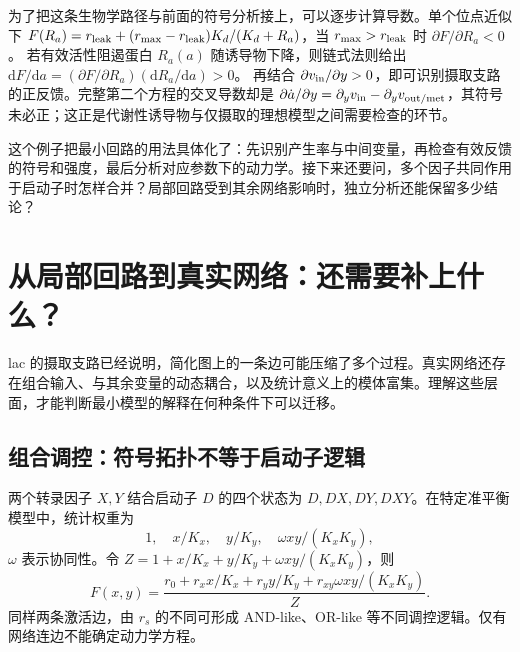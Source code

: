 \documentclass[11pt,a4paper,UTF8,fontset=fandol]{ctexart}
\newcommand{\dd}{\mathrm d}\newcommand{\R}{\mathbb R}\newcommand{\ssv}{\mathrm{ss}}
\begin{document}
为了把这条生物学路径与前面的符号分析接上，可以逐步计算导数。单个位点近似下 $F(R_a)=r_{\rm leak}+(r_{\rm max}-r_{\rm leak})K_d/(K_d+R_a)$，当 $r_{\rm max}>r_{\rm leak}$ 时 $\partial F/\partial R_a<0$。
若有效活性阻遏蛋白 $R_a(a)$ 随诱导物下降，则链式法则给出 $\dd F/\dd a=(\partial F/\partial R_a)(\dd R_a/\dd a)>0$。
再结合 $\partial v_{\rm in}/\partial y>0$，即可识别摄取支路的正反馈。完整第二个方程的交叉导数却是
$\partial\dot a/\partial y=\partial_yv_{\rm in}-\partial_yv_{\rm out/met}$，其符号未必正；这正是代谢性诱导物与仅摄取的理想模型之间需要检查的环节。

这个例子把最小回路的用法具体化了：先识别产生率与中间变量，再检查有效反馈的符号和强度，最后分析对应参数下的动力学。接下来还要问，多个因子共同作用于启动子时怎样合并？局部回路受到其余网络影响时，独立分析还能保留多少结论？

\section{从局部回路到真实网络：还需要补上什么？}
lac 的摄取支路已经说明，简化图上的一条边可能压缩了多个过程。真实网络还存在组合输入、与其余变量的动态耦合，以及统计意义上的模体富集。理解这些层面，才能判断最小模型的解释在何种条件下可以迁移。
\subsection{组合调控：符号拓扑不等于启动子逻辑}
两个转录因子 $X,Y$ 结合启动子 $D$ 的四个状态为 $D,DX,DY,DXY$。在特定准平衡模型中，统计权重为
\begin{equation}1,\quad x/K_x,\quad y/K_y,\quad\omega xy/(K_xK_y),\end{equation}
$\omega$ 表示协同性。令 $Z=1+x/K_x+y/K_y+\omega xy/(K_xK_y)$，则
\begin{equation}F(x,y)=\frac{r_0+r_xx/K_x+r_yy/K_y+r_{xy}\omega xy/(K_xK_y)}{Z}.\end{equation}
同样两条激活边，由 $r_s$ 的不同可形成 AND-like、OR-like 等不同调控逻辑。仅有网络连边不能确定动力学方程。
\end{document}
